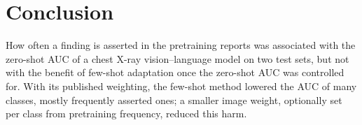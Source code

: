 \documentclass[journal]{IEEEtran}
\begin{document}
\section{Conclusion}
How often a finding is asserted in the pretraining reports was associated with the zero-shot AUC of a chest X-ray
vision--language model on two test sets, but not with the benefit of few-shot adaptation once the
zero-shot AUC was controlled for. With its published weighting, the few-shot method lowered the AUC of many
classes, mostly frequently asserted ones; a smaller image weight, optionally set per class from pretraining frequency,
reduced this harm.



\end{document}
